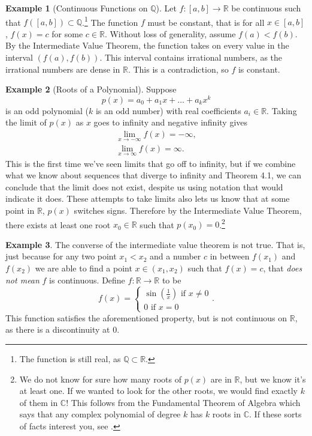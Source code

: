 \documentclass{article}
\newcommand{\R}{\mathbb{R}}
\newcommand{\Q}{\mathbb{Q}}
\theoremstyle{definition}
\newtheorem{example}{Example}[section]
\begin{document}
\begin{example}[Continuous Functions on $ \Q $]
	Let $ f:[a,b]\to\R $ be continuous such that $ f([a,b])\subset\Q $.\footnote{The function is still real, as $ \Q\subset\R $.} The function $ f $ must be constant, that is for all $ x\in[a,b] $, $ f(x)=c $ for some $ c\in\R $. Without loss of generality, assume $ f(a)<f(b) $. By the Intermediate Value Theorem, the function takes on every value in the interval $ (f(a),f(b)) $. This interval contains irrational numbers, as the irrational numbers are dense in $ \R $. This is a contradiction, so $ f $ is constant.   
\end{example}
\begin{example}[Roots of a Polynomial]
	Suppose $$ p(x)=a_0+a_1x+\ldots+a_kx^k $$ is an odd polynomial ($ k $ is an odd number) with real coefficients $ a_i\in\R $. Taking the limit of $ p(x) $ as $ x $ goes to infinity and negative infinity gives \begin{align*}
		\lim\limits_{x\to-\infty}f(x)=-\infty,\\
		\lim\limits_{x\to\infty}f(x)=\infty.
	\end{align*}
	This is the first time we've seen limits that go off to infinity, but if we combine what we know about sequences that diverge to infinity and Theorem 4.1, we can conclude that the limit does not exist, despite us using notation that would indicate it does. These attempts to take limits also lets us know that at some point in $ \R $, $ p(x) $ switches signs. Therefore by the Intermediate Value Theorem, there exists at least one root $ x_0\in\R $ such that $ p(x_0)=0 $.\footnote{We do not know for sure how many roots of $ p(x) $ are in $ \R $, but we know it's at least one. If we wanted to look for the other roots, we would find exactly $ k $ of them in $ \mathbb{C} $! This follows from the Fundamental Theorem of Algebra which says that any complex polynomial of degree $ k $ has $ k $ roots in $ \mathbb{C} $. If these sorts of facts interest you, see \cite{dummit2004abstract}.} 
\end{example}
\begin{example}
	The converse of the intermediate value theorem is not true. That is, just because for any two point $ x_1<x_2 $ and a number $ c $ in between $ f(x_1) $ and $ f(x_2) $ we are able to find a point $ x\in(x_1,x_2) $ such that $ f(x)=c $, that \textit{does not mean} $ f $ is continuous. Define $ f:\R\to\R $ to be $$f(x)=\begin{cases}
	\sin\left(\frac{1}{x}\right)\text{ if }x\neq 0\\
	0\text{ if }x=0
	\end{cases} .$$ This function satisfies the aforementioned property, but is not continuous on $ \R $, as there is a discontinuity at $ 0 $. 
\end{example}
\end{document}
